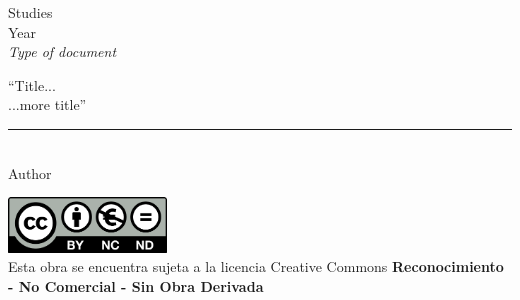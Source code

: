 \documentclass[11pt]{report} %
\begin{document}
	
\begin{titlepage}
	\begin{sffamily}
	\color{azulUC3M}
	\begin{center}
		\begin{figure}[H] %
		\end{figure}
		\vspace{2.5cm}
		\begin{Large}
			Studies\\			
			Year\\
			\vspace{2cm}		
			\textsl{Type of document}
			\bigskip
			
		\end{Large}
		 	{\huge ``Title...}\\
		 	\vspace*{0.4cm}
		 	{\huge ...more title''}\\
		 	\vspace*{0.5cm}
	 		\rule{10.5cm}{0.1mm}\\
			\vspace*{0.9cm}
			{\LARGE Author}\\ 
			\vspace*{1cm}
	\end{center}
	\vfill
	\color{black}
	\includegraphics[width=4.2cm]{imagenes/creativecommons.png}\\
	Esta obra se encuentra sujeta a la licencia Creative Commons \textbf{Reconocimiento - No Comercial - Sin Obra Derivada}
	\end{sffamily}
\end{titlepage}
\end{document}
